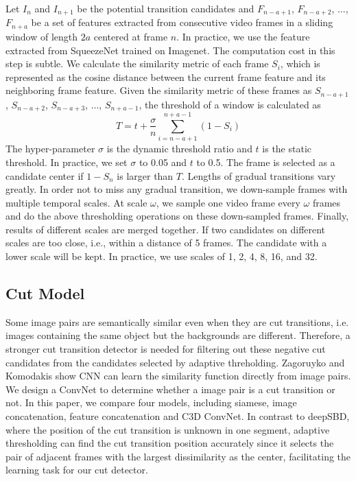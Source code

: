 \documentclass[runningheads]{llncs}
\begin{document}
Let \(I_n\) and \(I_{n+1}\) be the potential transition candidates and \(F_{n-a+1}\), \(F_{n-a+2}\), ..., \(F_{n+a}\) be a set of features extracted from consecutive video frames in a sliding window of length \(2a\) centered at frame \(n\). In practice, we use the feature extracted from SqueezeNet\cite{iandola2016squeezenet} trained on Imagenet\cite{deng2009imagenet}. The computation cost in this step is subtle. We calculate the similarity metric of each frame \(S_i\), which is represented as the cosine distance between the current frame feature and its neighboring frame feature. Given the similarity metric of these frames as \(S_{n-a+1}\), \(S_{n-a+2}\), \(S_{n-a+3}\), ..., \(S_{n+a-1}\), the threshold of a window is calculated as
\begin{equation}
    T=t+\frac{\sigma}{n}\sum_{i=n-a+1}^{n+a-1}(1-S_i)
\end{equation}
 The hyper-parameter \(\sigma\) is the dynamic threshold ratio and \(t\) is the static threshold. In practice, we set \(\sigma\) to 0.05 and \(t\) to 0.5. The frame is selected as a candidate center if \(1-S_n\) is larger than \(T\). Lengths of gradual transitions vary greatly. In order not to miss any gradual transition, we down-sample frames with multiple temporal scales. At scale \(\omega\), we sample one video frame every \(\omega\) frames and do the above thresholding operations on these down-sampled frames. Finally, results of different scales are merged together. If two candidates on different scales are too close, i.e., within a distance of 5 frames. The candidate with a lower scale will be kept. In practice, we use scales of 1, 2, 4, 8, 16, and 32.

\subsection{Cut Model}\label{sec:1}
 Some image pairs are semantically similar even when they are cut transitions, i.e. images containing the same object but the backgrounds are different. Therefore, a stronger cut transition detector is needed for filtering out these negative cut candidates from the candidates selected by adaptive threholding. Zagoruyko and Komodakis\cite{zagoruyko2015learning} show CNN can learn the similarity function directly from image pairs. We design a ConvNet to determine whether a image pair is a cut transition or not. In this paper, we compare four models, including siamese, image concatenation, feature concatenation and C3D ConvNet. In contrast to deepSBD, where the position of the cut transition is unknown in one segment, adaptive thresholding can find the cut transition position accurately since it selects the pair of adjacent frames with the largest dissimilarity as the center, facilitating the learning task for our cut detector.
\end{document}
